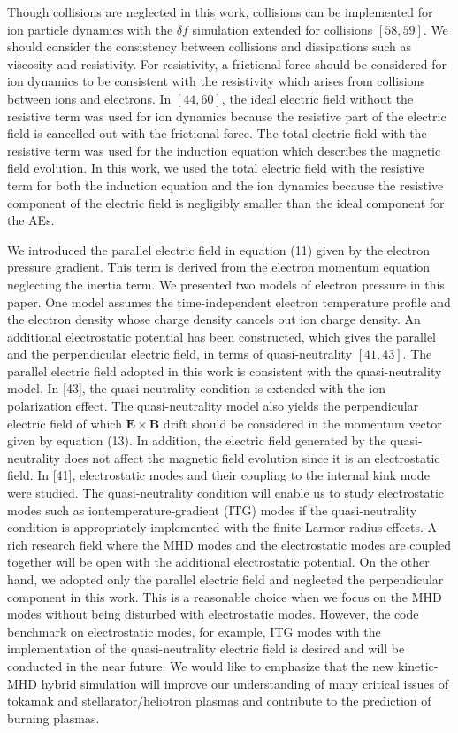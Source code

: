 \documentclass[10pt]{article}
\begin{document}
Though collisions are neglected in this work, collisions can be implemented for ion particle dynamics with the $\delta f$ simulation extended for collisions $[58,59]$. We should consider the consistency between collisions and dissipations such as viscosity and resistivity. For resistivity, a frictional force should be considered for ion dynamics to be consistent with the resistivity which arises from collisions between ions and electrons. In $[44,60]$, the ideal electric field without the resistive term was used for ion dynamics because the resistive part of the electric field is cancelled out with the frictional force. The total electric field with the resistive term was used for the induction equation which describes the magnetic field evolution. In this work, we used the total electric field with the resistive term for both the induction equation and the ion dynamics because the resistive component of the electric field is negligibly smaller than the ideal component for the AEs.

We introduced the parallel electric field in equation (11) given by the electron pressure gradient. This term is derived from the electron momentum equation neglecting the inertia term. We presented two models of electron pressure in this paper. One model assumes the time-independent electron temperature profile and the electron density whose charge density cancels out ion charge density. An additional electrostatic potential has been constructed, which gives the parallel and the perpendicular electric field, in terms of quasi-neutrality $[41,43]$. The parallel electric field adopted in this work is consistent with the quasi-neutrality model. In [43], the quasi-neutrality condition is extended with the ion polarization effect. The quasi-neutrality model also yields the perpendicular electric field of which $\mathbf{E} \times \mathbf{B}$ drift should be considered in the momentum vector given by equation (13). In addition, the electric field generated by the quasi-neutrality does not affect the magnetic field evolution since it is an electrostatic field. In [41], electrostatic modes and their coupling to the internal kink mode were studied. The quasi-neutrality condition will enable us to study electrostatic modes such as iontemperature-gradient (ITG) modes if the quasi-neutrality condition is appropriately implemented with the finite Larmor radius effects. A rich research field where the MHD modes and the electrostatic modes are coupled together will be open with the additional electrostatic potential. On the other hand, we adopted only the parallel electric field and neglected the perpendicular component in this work. This is a reasonable choice when we focus on the MHD modes without being disturbed with electrostatic modes. However, the code benchmark on electrostatic modes, for example, ITG modes with the implementation of the quasi-neutrality electric field is desired and will be conducted in the near future. We would like to emphasize that the new kinetic-MHD hybrid simulation will improve our understanding of many critical issues of tokamak and stellarator/heliotron plasmas and contribute to the prediction of burning plasmas.
\end{document}
